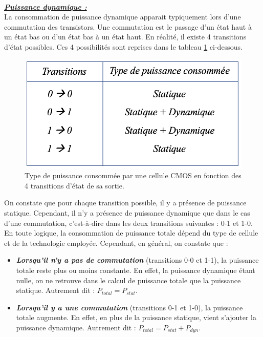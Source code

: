 \documentclass[oneside]{book}
\begin{document}
\hspace{-0.5 cm}
\vspace{0.3 cm} \\
\hspace{-0.5 cm}\underline{\textbf{\textit{Puissance dynamique :}}} \vspace{0.2 cm} \\
La consommation de puissance dynamique apparait typiquement lors d'une commutation des transistors. Une commutation est le passage d'un état haut à un état bas ou d'un état bas à un état haut. En réalité, il existe 4 transitions d'état possibles. Ces 4 possibilités sont reprises dans le tableau \ref{fig:dyn} ci-dessous. 
\begin{figure}[htbp]
    \centering
    \includegraphics[scale=0.4]{image/dyn}
    \caption{Type de puissance consommée par une cellule CMOS en fonction des 4 transitions d'état de sa sortie.}
    \label{fig:dyn} 
\end{figure}

\hspace{-0.5 cm}On constate que pour chaque transition possible, il y a présence de puissance statique. Cependant, il n'y a présence de puissance dynamique que dans le cas d'une commutation, c'est-à-dire dans les deux transitions suivantes : 0-1 et 1-0.  En toute logique, la consommation de puissance totale dépend du type de cellule et de la technologie employée. Cependant, en général, on constate que : 
\begin{itemize}
\item \textbf{\textit{Lorsqu'il n'y a pas de commutation}} (transitions 0-0 et 1-1), la puissance totale reste plus ou moins constante. En effet, la puissance dynamique étant nulle, on ne retrouve dans le calcul de puissance totale que la puissance statique. Autrement dit : $P_{total}=P_{stat}$.
\item \textbf{\textit{Lorsqu'il y a une commutation}} (transitions 0-1 et 1-0), la puissance totale augmente. En effet, en plus de la puissance statique, vient s'ajouter la puissance dynamique. Autrement dit : $P_{total}=P_{stat}+P_{dyn}$.
\end{itemize}
\end{document}
